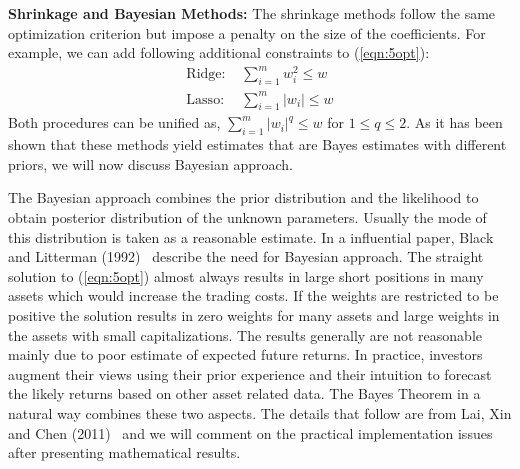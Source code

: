 \noindent \textbf{Shrinkage and Bayesian Methods:} The shrinkage methods follow the same optimization criterion but impose a penalty on the size of the coefficients. For example, we can add following additional constraints to (\ref{eqn:5opt}):
	\begin{equation}\label{eqn:addconstraint}
	\begin{split}
	\text{Ridge: }& \sum_{i=1}^m w_i^2 \leq w \\
	\text{Lasso: }&\sum_{i=1}^m |w_i| \leq w
	\end{split}
	\end{equation}
Both procedures can be unified as, $\sum_{i=1}^m |w_i|^q \leq w$ for $1 \leq q \leq 2$. As it has been shown that these methods yield estimates that are Bayes estimates with different priors, we will now discuss Bayesian approach. 


The Bayesian approach combines the prior distribution and the likelihood to obtain posterior distribution of the unknown parameters. Usually the mode of this distribution is taken as a reasonable estimate. In a influential paper, Black and Litterman (1992)~\cite{blacklit} describe the need for Bayesian approach. The straight solution to (\ref{eqn:5opt}) almost always results in large short positions in many assets which would increase the trading costs. If the weights are restricted to be positive the solution results in zero weights for many assets and large weights in the assets with small capitalizations. The results generally are not reasonable mainly due to poor estimate of expected future returns. In practice, investors augment their views using their prior experience and their intuition to forecast the likely returns based on other asset related data. The Bayes Theorem in a natural way combines these two aspects. The details that follow are from Lai, Xin and Chen (2011)~\cite{laixingchen} and we will comment on the practical implementation issues after presenting mathematical results. 


